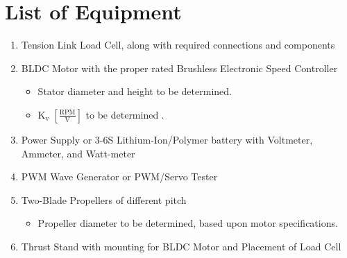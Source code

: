 \documentclass{article}
\begin{document}
\section{List of Equipment}
\begin{enumerate}
    \item Tension Link Load Cell, along with required connections and components
    \item BLDC Motor with the proper rated Brushless Electronic Speed Controller 
    \begin{itemize}
        \item Stator diameter and height to be determined.
        \item $\text{K}_{\text{v}}\; [\frac{
        \text{RPM}}{\text{V}}]$ to be determined .
    \end{itemize}
    \item Power Supply or 3-6S Lithium-Ion/Polymer battery with Voltmeter, Ammeter, and Watt-meter
    \item PWM Wave Generator or PWM/Servo Tester
    \item Two-Blade Propellers of different pitch
    \begin{itemize}
        \item Propeller diameter to be determined, based upon motor specifications.
    \end{itemize}
    \item Thrust Stand with mounting for BLDC Motor and Placement of Load Cell
\end{enumerate}
\end{document}
